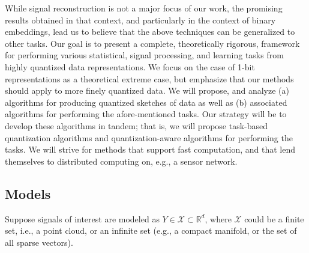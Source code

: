 While signal reconstruction is not a major focus of our work, the promising results obtained in that context, and particularly in the context of binary embeddings, lead us to believe that the above techniques can be generalized to other tasks. 
Our goal  is to present a complete, theoretically rigorous, framework for performing various statistical, signal processing, and learning tasks from highly quantized data representations. We focus on the case of 1-bit representations as a theoretical extreme case, but emphasize that our methods should apply to more finely quantized data. We will propose, and analyze  (a) algorithms for  producing quantized sketches of data as well as (b) associated algorithms for performing the afore-mentioned tasks. Our strategy will be to develop these algorithms in tandem; that is, we will propose task-based quantization algorithms and quantization-aware algorithms for performing the tasks. We will strive for methods that support fast computation, and that lend themselves to distributed computing on, e.g., a sensor network.

\subsection{Models}
  
Suppose signals of interest are modeled as $Y\in \mathcal{X} \subset
\mathbb{R}^d$, where $\mathcal{X}$ could be a finite set, i.e., a
point cloud, or an infinite set (e.g., a compact manifold, or the set
of all sparse vectors).

